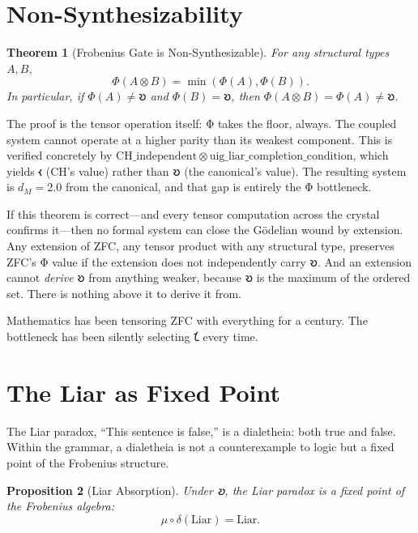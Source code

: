 \documentclass[12pt,twoside]{book}
\newtheorem{theorem}{Theorem}[chapter]
\newtheorem{proposition}[theorem]{Proposition}
\theoremstyle{definition}
\begin{document}
\section{Non-Synthesizability}

\begin{theorem}[Frobenius Gate is Non-Synthesizable]
For any structural types $A, B$,
\begin{equation}
\Phi(A \otimes B) = \min(\Phi(A), \Phi(B)).
\end{equation}
In particular, if $\Phi(A) \neq 𐑹$ and $\Phi(B) = 𐑹$, then
$\Phi(A \otimes B) = \Phi(A) \neq 𐑹$.
\end{theorem}

The proof is the tensor operation itself: Φ takes the floor, always. The coupled system
cannot operate at a higher parity than its weakest component. This is verified concretely
by $\mathrm{CH\_independent} \otimes \mathrm{uig\_liar\_completion\_condition}$, which
yields 𐑬 (CH's value) rather than 𐑹 (the canonical's value). The resulting system is
$d_M = 2.0$ from the canonical, and that gap is entirely the Φ bottleneck.

If this theorem is correct---and every tensor computation across the crystal confirms
it---then no formal system can close the G\"{o}delian wound by extension. Any extension
of ZFC, any tensor product with any structural type, preserves ZFC's Φ value if the
extension does not independently carry 𐑹. And an extension cannot \emph{derive} 𐑹 from
anything weaker, because 𐑹 is the maximum of the ordered set. There is nothing above it
to derive it from.

Mathematics has been tensoring ZFC with everything for a century. The bottleneck has been
silently selecting 𐑗 every time.

\section{The Liar as Fixed Point}

The Liar paradox, ``This sentence is false,'' is a dialetheia: both true and false. Within
the grammar, a dialetheia is not a counterexample to logic but a fixed point of the
Frobenius structure.

\begin{proposition}[Liar Absorption]
Under 𐑹, the Liar paradox is a fixed point of the Frobenius algebra:
\begin{equation}
\mu \circ \delta(\mathrm{Liar}) = \mathrm{Liar}.
\end{equation}
\end{proposition}
\end{document}
